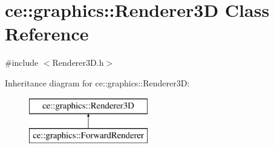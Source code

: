 \hypertarget{classce_1_1graphics_1_1_renderer3_d}{}\section{ce\+:\+:graphics\+:\+:Renderer3D Class Reference}
\label{classce_1_1graphics_1_1_renderer3_d}


{\ttfamily \#include $<$Renderer3\+D.\+h$>$}

Inheritance diagram for ce\+:\+:graphics\+:\+:Renderer3D\+:\begin{figure}[H]
\begin{center}
\leavevmode
\includegraphics[height=2.000000cm]{classce_1_1graphics_1_1_renderer3_d}
\end{center}
\end{figure}
